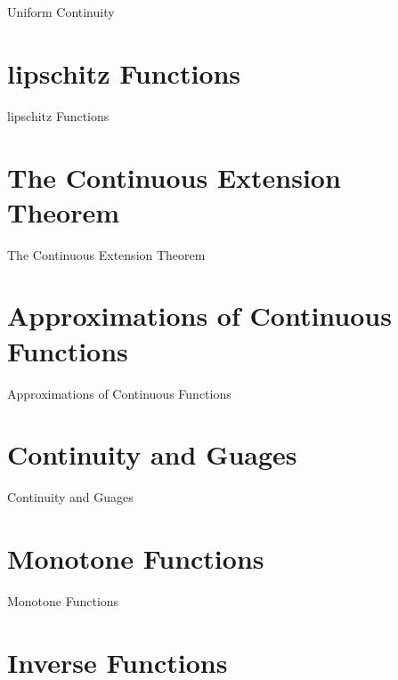 Uniform Continuity

\section{lipschitz Functions}
\label{sec:lipschitz-functions}

lipschitz Functions

\section{The Continuous Extension Theorem}
\label{sec:the-continuous-extension-theorem}

The Continuous Extension Theorem

\section{Approximations of Continuous Functions}
\label{sec:approximations-of-continuous-functions}

Approximations of Continuous Functions

\section{Continuity and Guages}
\label{sec:continuity-and-guages}

Continuity and Guages

\section{Monotone Functions}
\label{sec:monotone-functions}

Monotone Functions

\section{Inverse Functions}
\label{sec:inverse-functions}

